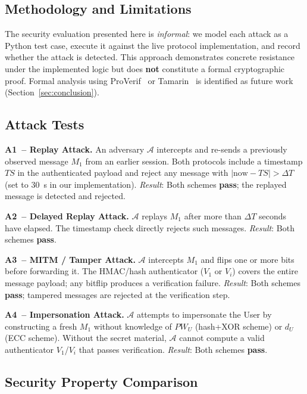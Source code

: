 \documentclass[journal]{IEEEtran}
\newcommand{\PW}{\mathit{PW}}          %
\newcommand{\TS}{\mathit{TS}}          %
\newcommand{\adv}{\mathcal{A}}         %
\begin{document}
\subsection{Methodology and Limitations}

The security evaluation presented here is \emph{informal}: we model each
attack as a Python test case, execute it against the live protocol
implementation, and record whether the attack is detected. This approach
demonstrates concrete resistance under the implemented logic but does
\textbf{not} constitute a formal cryptographic proof. Formal analysis using
ProVerif~\cite{Blanchet2016} or Tamarin~\cite{Meieretal2013} is identified
as future work (Section~\ref{sec:conclusion}).

\subsection{Attack Tests}

\textbf{A1~-- Replay Attack.}
An adversary $\adv$ intercepts and re-sends a previously observed message
$M_1$ from an earlier session. Both protocols include a timestamp $\TS$ in
the authenticated payload and reject any message with
$|\text{now} - \TS| > \Delta T$ (set to 30~s in our implementation).
\emph{Result}: Both schemes \textbf{pass}; the replayed message is detected
and rejected.

\textbf{A2~-- Delayed Replay Attack.}
$\adv$ replays $M_1$ after more than $\Delta T$ seconds have elapsed.
The timestamp check directly rejects such messages.
\emph{Result}: Both schemes \textbf{pass}.

\textbf{A3~-- MITM / Tamper Attack.}
$\adv$ intercepts $M_1$ and flips one or more bits before forwarding it.
The HMAC/hash authenticator ($V_1$ or $V_i$) covers the entire message
payload; any bitflip produces a verification failure.
\emph{Result}: Both schemes \textbf{pass}; tampered messages are rejected at
the verification step.

\textbf{A4~-- Impersonation Attack.}
$\adv$ attempts to impersonate the User by constructing a fresh $M_1$
without knowledge of $\PW_U$ (hash+XOR scheme) or $d_U$ (ECC scheme).
Without the secret material, $\adv$ cannot compute a valid authenticator
$V_1$/$V_i$ that passes verification.
\emph{Result}: Both schemes \textbf{pass}.

\subsection{Security Property Comparison}
\end{document}
